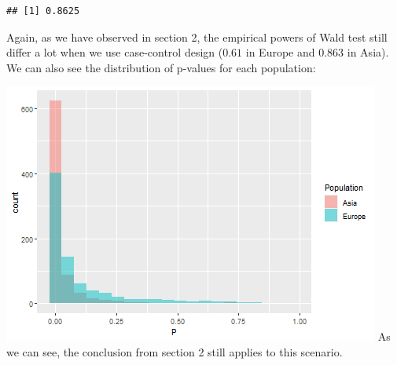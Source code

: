 \documentclass[
]{article}
\newenvironment{Shaded}{\begin{snugshade}}{\end{snugshade}}
\newcommand{\DataTypeTok}[1]{\textcolor[rgb]{0.13,0.29,0.53}{#1}}
\newcommand{\DecValTok}[1]{\textcolor[rgb]{0.00,0.00,0.81}{#1}}
\newcommand{\FloatTok}[1]{\textcolor[rgb]{0.00,0.00,0.81}{#1}}
\newcommand{\KeywordTok}[1]{\textcolor[rgb]{0.13,0.29,0.53}{\textbf{#1}}}
\newcommand{\NormalTok}[1]{#1}
\newcommand{\OperatorTok}[1]{\textcolor[rgb]{0.81,0.36,0.00}{\textbf{#1}}}
\newcommand{\StringTok}[1]{\textcolor[rgb]{0.31,0.60,0.02}{#1}}
\begin{document}
\begin{verbatim}
## [1] 0.8625
\end{verbatim}

Again, as we have observed in section 2, the empirical powers of Wald
test still differ a lot when we use case-control design (\(0.61\) in
Europe and \(0.863\) in Asia). We can also see the distribution of
p-values for each population:

\begin{Shaded}
\end{Shaded}

\includegraphics{GWAS-Pvalues_files/figure-latex/visualCaseControl-1.png}
As we can see, the conclusion from section 2 still applies to this
scenario.
\end{document}
